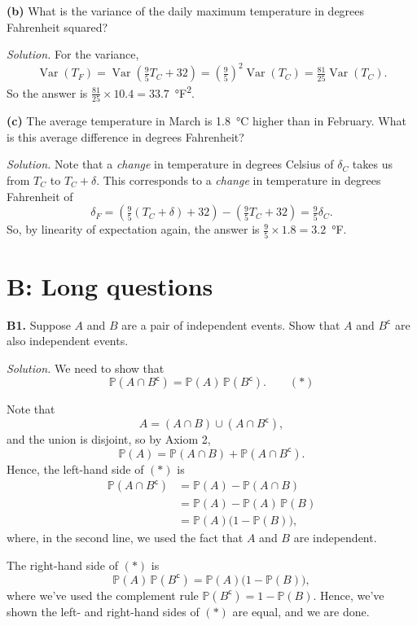 \documentclass[
  a4paper,
]{book}
\theoremstyle{definition}
\theoremstyle{definition}
\theoremstyle{definition}
\theoremstyle{definition}
\theoremstyle{remark}
\begin{document}
\textbf{(b)} What is the variance of the daily maximum temperature in degrees Fahrenheit squared?

\begin{myanswers}
\emph{Solution.}
For the variance,
\[ \operatorname{Var}(T_F) = \operatorname{Var}\left(\tfrac95T_C + 32\right) = \left(\tfrac95\right)^2 \operatorname{Var}(T_C) = \tfrac{81}{25}\operatorname{Var}(T_C). \]
So the answer is \(\frac{81}{25} \times 10.4 = 33.7\)~°F\textsuperscript{2}.

\end{myanswers}

\textbf{(c)} The average temperature in March is 1.8~°C higher than in February. What is this average difference in degrees Fahrenheit?

\begin{myanswers}
\emph{Solution.}
Note that a \emph{change} in temperature in degrees Celsius of \(\delta_C\) takes us from \(T_C\) to \(T_C + \delta\). This corresponds to a \emph{change} in temperature in degrees Fahrenheit of
\[ \delta_F = \left(\tfrac95(T_C+\delta) + 32\right) - \left(\tfrac95T_C + 32\right) = \tfrac95\delta_C . \]
So, by linearity of expectation again, the answer is \(\frac95 \times 1.8 = 3.2\)~°F.

\end{myanswers}

\hypertarget{P3-long}{%
\section*{B: Long questions}\label{P3-long}}

\textbf{B1.} Suppose \(A\) and \(B\) are a pair of independent events. Show that \(A\) and \(B^\mathsf{c}\) are also independent events.

\begin{myanswers}
\emph{Solution.}
We need to show that
\[ \mathbb P(A \cap B^\mathsf{c}) = \mathbb P(A) \, \mathbb P(B^\mathsf{c}) . \qquad (*) \]

Note that
\[ A = (A \cap B) \cup (A \cap B^\mathsf{c}) , \]
and the union is disjoint, so by Axiom 2,
\[ \mathbb P(A) = \mathbb P(A \cap B) + \mathbb P(A \cap B^\mathsf{c}) . \]
Hence, the left-hand side of \((*)\) is
\begin{align*}
\mathbb P(A \cap B^\mathsf{c})
&= \mathbb P(A) - \mathbb P(A \cap B) \\
&= \mathbb P(A) - \mathbb P(A)\,\mathbb P(B) \\
&= \mathbb P(A) \big(1 - \mathbb P(B)\big) ,
\end{align*}
where, in the second line, we used the fact that \(A\) and \(B\) are independent.

The right-hand side of \((*)\) is
\[\mathbb P(A) \, \mathbb P(B^\mathsf{c}) = \mathbb P(A) \big(1 - \mathbb P(B)\big) , \]
where we've used the complement rule \(\mathbb P(B^\mathsf{c}) = 1- \mathbb P(B)\). Hence, we've shown the left- and right-hand sides of \((*)\) are equal, and we are done.

\end{myanswers}
\end{document}
